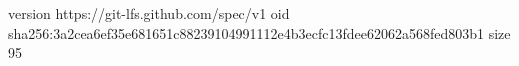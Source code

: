 version https://git-lfs.github.com/spec/v1
oid sha256:3a2cea6ef35e681651c88239104991112e4b3ecfc13fdee62062a568fed803b1
size 95
